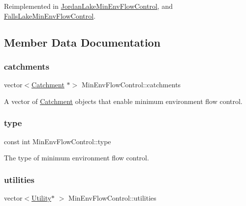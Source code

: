 Reimplemented in \mbox{\hyperlink{classJordanLakeMinEnvFlowControl_aa1e816121060212f3dbeffda90a7baec}{Jordan\+Lake\+Min\+Env\+Flow\+Control}}, and \mbox{\hyperlink{classFallsLakeMinEnvFlowControl_a6ea8a5e9ff9179066cceb77d896f3f97}{Falls\+Lake\+Min\+Env\+Flow\+Control}}.



\subsection{Member Data Documentation}
\mbox{\label{classMinEnvFlowControl_a99502573f30daf84d9ad7a2f62197b77}} 
\subsubsection{\texorpdfstring{catchments}{catchments}}
{\footnotesize\ttfamily vector$<$\mbox{\hyperlink{classCatchment}{Catchment}} $\ast$$>$ Min\+Env\+Flow\+Control\+::catchments\hspace{0.3cm}{\ttfamily [protected]}}



A vector of \mbox{\hyperlink{classCatchment}{Catchment}} objects that enable minimum environment flow control. 

\mbox{\label{classMinEnvFlowControl_abc3f168cd1ec36ba59e4b8604dfae8ec}} 
\subsubsection{\texorpdfstring{type}{type}}
{\footnotesize\ttfamily const int Min\+Env\+Flow\+Control\+::type}



The type of minimum environment flow control. 

\mbox{\label{classMinEnvFlowControl_a1a0a309138b35e8199c205efb5fb5f80}} 
\subsubsection{\texorpdfstring{utilities}{utilities}}
{\footnotesize\ttfamily vector$<$\mbox{\hyperlink{classUtility}{Utility}}$\ast$ $>$ Min\+Env\+Flow\+Control\+::utilities\hspace{0.3cm}{\ttfamily [protected]}}



